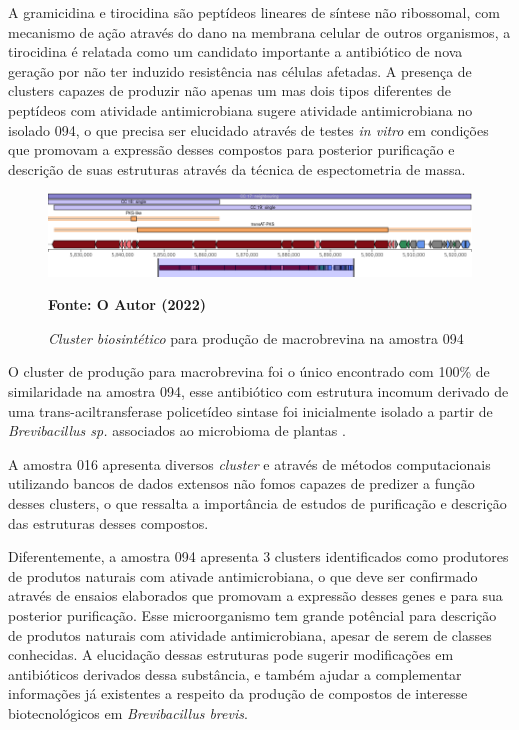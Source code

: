 A gramicidina e tirocidina são peptídeos lineares de síntese não ribossomal, com mecanismo de ação
através do dano na membrana celular de outros organismos, a tirocidina é relatada como um candidato importante
a antibiótico de nova geração por não ter induzido resistência nas células afetadas\cite{yang2018antimicrobial}.
A presença de clusters capazes de produzir não apenas um mas dois tipos diferentes de peptídeos com
atividade antimicrobiana sugere atividade antimicrobiana no isolado 094, o que precisa ser elucidado através
de testes \textit{in vitro} em condições que promovam a expressão desses compostos para posterior purificação e
descrição de suas estruturas através da técnica de espectometria de massa.

\begin{figure}[H]
	\caption{\textit{Cluster biosintético} para produção de macrobrevina na amostra 094}
	\label{fig:quast_16}
	\centering
		\includegraphics[width=0.8\linewidth]{imagens/antismash/094regiao4.png} \\
	\centering
    \begin{small}\textbf{Fonte: O Autor (2022)}\end{small}
\end{figure}
\vspace{\floatsep}

O cluster de produção para macrobrevina foi o único encontrado com 100\% de similaridade na amostra
094, esse antibiótico com estrutura incomum derivado de uma trans-aciltransferase policetídeo sintase foi inicialmente isolado
a partir de \textit{Brevibacillus sp.} associados ao microbioma de plantas \cite{helfrich2018bipartite}.

A amostra 016 apresenta diversos \textit{cluster} e através de métodos computacionais utilizando bancos
de dados extensos não fomos capazes de predizer a função desses clusters, o que ressalta a importância de 
estudos de purificação e descrição das estruturas desses compostos.

Diferentemente, a amostra 094 apresenta 3 clusters identificados como produtores de produtos naturais com
ativade antimicrobiana, o que deve ser confirmado através de ensaios elaborados que promovam a expressão
desses genes e para sua posterior purificação. Esse microorganismo tem grande potêncial para descrição de 
produtos naturais com atividade antimicrobiana, apesar de serem de classes conhecidas. A elucidação dessas
estruturas pode sugerir modificações em antibióticos derivados dessa substância, e também ajudar a complementar
informações já existentes a respeito da produção de compostos de interesse biotecnológicos em \textit{Brevibacillus brevis}.

